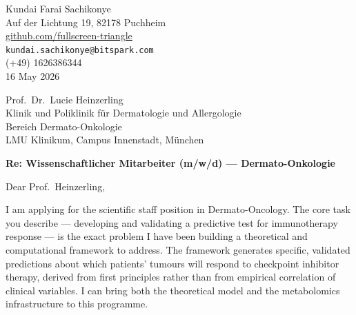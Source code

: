 \documentclass[12pt,a4paper]{article}
\begin{document}
\begin{flushright}
Kundai Farai Sachikonye \\
Auf der Lichtung 19, 82178 Puchheim \\
\href{https://github.com/fullscreen-triangle}{github.com/fullscreen-triangle} \\
\texttt{kundai.sachikonye@bitspark.com} \\
(+49) 1626386344 \\[6pt]
16 May 2026
\end{flushright}

\vspace{1em}

Prof.\ Dr.\ Lucie Heinzerling \\
Klinik und Poliklinik für Dermatologie und Allergologie \\
Bereich Dermato-Onkologie \\
LMU Klinikum, Campus Innenstadt, München

\vspace{1.5em}

\textbf{Re: Wissenschaftlicher Mitarbeiter (m/w/d) --- Dermato-Onkologie}

\vspace{1em}

Dear Prof.\ Heinzerling,

I am applying for the scientific staff position in Dermato-Oncology. The core task
you describe --- developing and validating a predictive test for immunotherapy response
--- is the exact problem I have been building a theoretical and computational framework
to address. The framework generates specific, validated predictions about which patients'
tumours will respond to checkpoint inhibitor therapy, derived from first principles
rather than from empirical correlation of clinical variables. I can bring both the
theoretical model and the metabolomics infrastructure to this programme.
\end{document}
